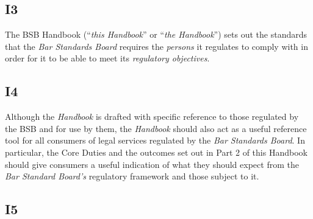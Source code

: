 \subsection{I3}

The BSB Handbook (``\emph{this Handbook}'' or ``\emph{the Handbook}'')
sets out the standards that the \emph{Bar \emph{Standards Board}}
requires the \emph{persons} it regulates to comply with in order for it
to be able to meet its \emph{regulatory objectives}.

\subsection{I4}

Although the \emph{Handbook} is drafted with specific reference to those
regulated by the BSB and for use by them, the \emph{Handbook} should
also act as a useful reference tool for all consumers of legal services
regulated by the \emph{Bar Standards Board}. In particular, the Core
Duties and the outcomes set out in Part 2 of this Handbook should give
consumers a useful indication of what they should expect from the
\emph{Bar \emph{Standard Board's}} regulatory framework and those
subject to it.



\subsection{I5}

